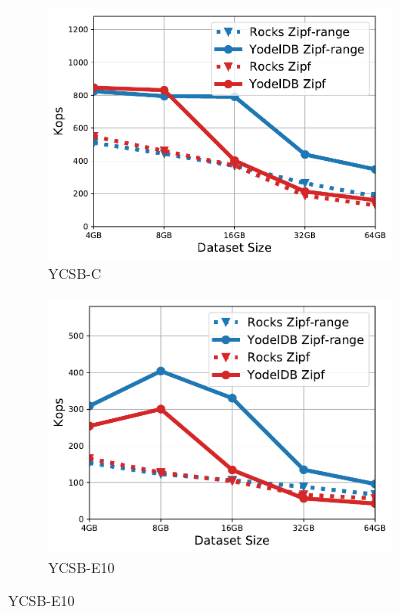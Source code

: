 \begin{figure}[tb]
\begin{subfigure}{0.3\linewidth}
\includegraphics[width=\textwidth]{figs/Workload_C_line.pdf}
\caption{YCSB-C}
\label{fig:throughput:c}
\end{subfigure}
\begin{subfigure}{0.3\linewidth}
\includegraphics[width=\textwidth]{figs/Workload_E-_line.pdf}
\caption{YCSB-E10}
\label{fig:throughput:e10}

\end{subfigure}
\end{figure}
